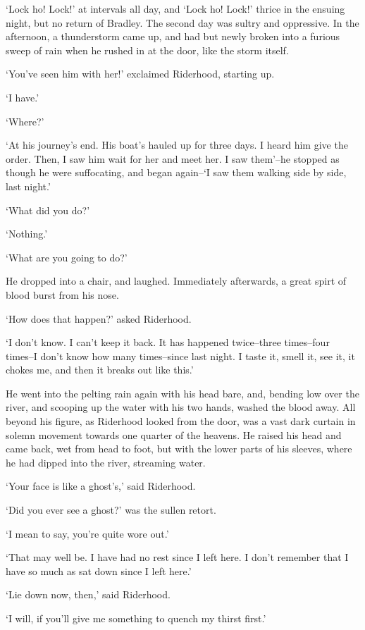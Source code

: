 ‘Lock ho! Lock!’ at intervals all day, and ‘Lock ho! Lock!’ thrice in
the ensuing night, but no return of Bradley. The second day was sultry
and oppressive. In the afternoon, a thunderstorm came up, and had but
newly broken into a furious sweep of rain when he rushed in at the door,
like the storm itself.

‘You’ve seen him with her!’ exclaimed Riderhood, starting up.

‘I have.’

‘Where?’

‘At his journey’s end. His boat’s hauled up for three days. I heard
him give the order. Then, I saw him wait for her and meet her. I saw
them’--he stopped as though he were suffocating, and began again--‘I saw
them walking side by side, last night.’

‘What did you do?’

‘Nothing.’

‘What are you going to do?’

He dropped into a chair, and laughed. Immediately afterwards, a great
spirt of blood burst from his nose.

‘How does that happen?’ asked Riderhood.

‘I don’t know. I can’t keep it back. It has happened twice--three
times--four times--I don’t know how many times--since last night. I
taste it, smell it, see it, it chokes me, and then it breaks out like
this.’

He went into the pelting rain again with his head bare, and, bending low
over the river, and scooping up the water with his two hands, washed the
blood away. All beyond his figure, as Riderhood looked from the door,
was a vast dark curtain in solemn movement towards one quarter of the
heavens. He raised his head and came back, wet from head to foot, but
with the lower parts of his sleeves, where he had dipped into the river,
streaming water.

‘Your face is like a ghost’s,’ said Riderhood.

‘Did you ever see a ghost?’ was the sullen retort.

‘I mean to say, you’re quite wore out.’

‘That may well be. I have had no rest since I left here. I don’t
remember that I have so much as sat down since I left here.’

‘Lie down now, then,’ said Riderhood.

‘I will, if you’ll give me something to quench my thirst first.’

